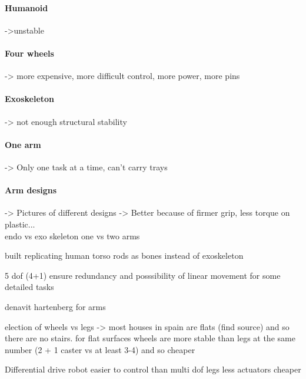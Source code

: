 

\paragraph{Humanoid} ->unstable


\paragraph{Four wheels} -> more expensive, more difficult control, more power, more pins

\paragraph{Exoskeleton} -> not enough structural stability

\paragraph{One arm} -> Only one task at a time, can't carry trays

\paragraph{Arm designs} -> Pictures of different designs -> Better because of firmer grip, less torque on plastic... 
\\	


endo vs exo skeleton
one vs two arms



built replicating human torso rods as bones instead of exoskeleton

5 dof (4+1) ensure redundancy and posssibility of linear movement for some detailed tasks

denavit hartenberg for arms

election of wheels vs legs -> most houses in spain are flats (find source) and so there are no stairs. for flat surfaces wheels are more stable than legs at the same number (2 + 1 caster vs at least 3-4) and so cheaper

Differential drive robot easier to control than multi dof legs  less actuators  cheaper